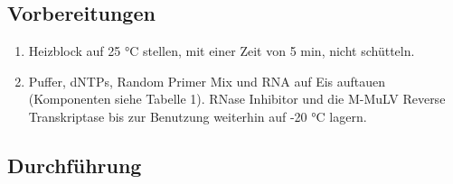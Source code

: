 \documentclass[a4paper,12pt]{article}
\begin{document}
\subsection*{Vorbereitungen}

\begin{enumerate}
    \item Heizblock auf 25 °C stellen, mit einer Zeit von 5 min, nicht schütteln.
    \item Puffer, dNTPs, Random Primer Mix und RNA auf Eis auftauen (Komponenten siehe Tabelle 1). RNase Inhibitor und die M-MuLV Reverse Transkriptase bis zur Benutzung weiterhin auf -20 °C lagern.
\end{enumerate}

\subsection*{Durchführung}
\end{document}
